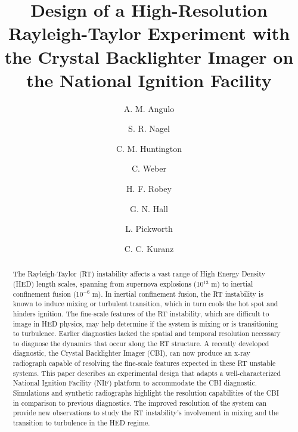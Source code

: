 \documentclass[%
 aip,
 amsmath,amssymb,
 reprint,
 floatfix
]{revtex4-1}
\begin{document}
\title{Design of a High-Resolution Rayleigh-Taylor Experiment with the Crystal Backlighter Imager on the National Ignition Facility}


\author{A. M. Angulo}

\author{S. R. Nagel}%

\author{C. M. Huntington}%

\author{C. Weber}%

\author{H. F. Robey}%

\author{G. N. Hall}%

\author{L. Pickworth}%

\author{C. C. Kuranz}



\begin{abstract}

The Rayleigh-Taylor (RT) instability affects a vast range of High Energy Density (HED) length scales, spanning from supernova explosions (10$^{13}$ m) to inertial confinement fusion (10$^{-6}$ m).  In inertial confinement fusion, the RT instability is known to induce mixing or turbulent transition, which in turn cools the hot spot and hinders ignition.  The fine-scale features of the RT instability, which are difficult to image in HED physics, may help determine if the system is mixing or is transitioning to turbulence.  Earlier diagnostics lacked the spatial and temporal resolution necessary to diagnose the dynamics that occur along the RT structure. A recently developed diagnostic, the Crystal Backlighter Imager (CBI), \cite{Hall:2019, DoZonePlate} can now produce an x-ray radiograph capable of resolving the fine-scale features expected in these RT unstable systems. This paper describes an experimental design that adapts a well-characterized National Ignition Facility (NIF) platform to accommodate the CBI diagnostic. Simulations and synthetic radiographs highlight the resolution capabilities of the CBI in comparison to previous diagnostics. The improved resolution of the system can provide new observations to study the RT instability's involvement in mixing and the transition to turbulence in the HED regime.  


  
\end{abstract}
\end{document}
